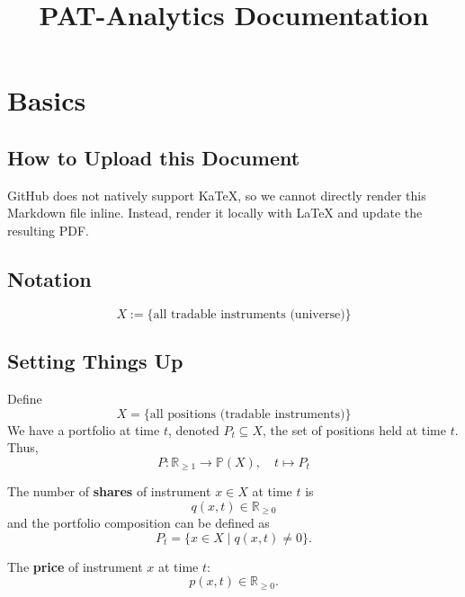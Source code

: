 \documentclass[12pt]{article}
\title{PAT-Analytics Documentation}
\author{}
\date{}
\begin{document}
\maketitle

\tableofcontents
\newpage

\section{Basics}

\subsection{How to Upload this Document}
GitHub does not natively support KaTeX, so we cannot directly render this Markdown file inline.  
Instead, render it locally with \LaTeX{} and update the resulting PDF.

\subsection{Notation}

\begin{equation}
X := \{\text{all tradable instruments (universe)}\}
\label{eq:universe}
\end{equation}

\subsection{Setting Things Up}
Define
\begin{equation}
X = \{ \text{all positions (tradable instruments)} \}
\end{equation}
We have a portfolio at time $ t $, denoted $ P_t \subseteq X $, the set of positions held at time $ t $. Thus,
\begin{equation}
P : \mathbb{R}_{\geq 1} \to \mathbb{P}(X), \quad t \mapsto P_t
\label{eq:portfolio_function}
\end{equation}

The number of \textbf{shares} of instrument $ x \in X $ at time $ t $ is
\begin{equation}
q(x,t) \in \mathbb{R}_{\geq 0}
\label{eq:quantity}
\end{equation}
and the portfolio composition can be defined as
\begin{equation}
P_t = \{x \in X \mid q(x,t) \neq 0\}.
\label{eq:positions_nonzero}
\end{equation}

The \textbf{price} of instrument $ x $ at time $ t $:
\begin{equation}
p(x,t) \in \mathbb{R}_{\geq 0}.
\label{eq:price}
\end{equation}
\end{document}
